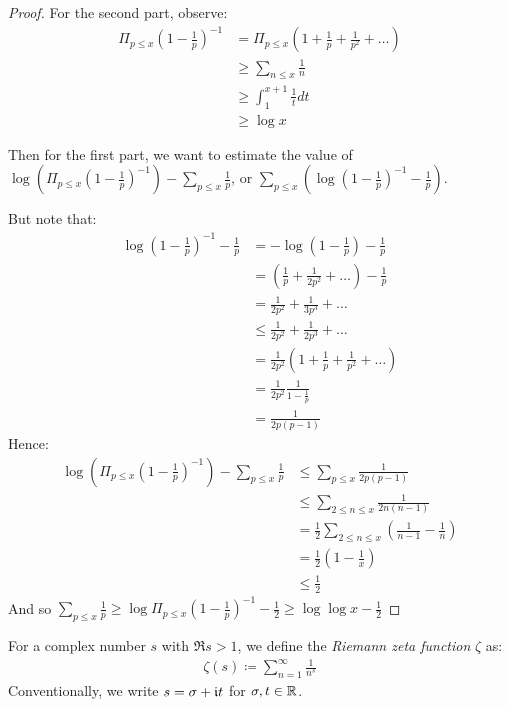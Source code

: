 \documentclass[10pt,a4paper]{article}
\begin{document}
\begin{proof}
For the second part, observe:
\begin{align*}
\Pi_{p\leq x} (1-\frac{1}{p})^{-1} &= \Pi_{p\leq x}(1+\frac{1}{p}+\frac{1}{p^2}+\ldots)\\
&\geq \sum_{n \leq x} \frac{1}{n}\\
&\geq \int_1^{x+1} \frac{1}{t} dt\\
&\geq \log x
\end{align*}

Then for the first part, we want to estimate the value of $\log\left(\Pi_{p\leq x}(1-\frac{1}{p})^{-1}\right) - \sum_{p\leq x}\frac{1}{p}$, or $\sum_{p\leq x}\left(\log(1-\frac{1}{p})^{-1} - \frac{1}{p}\right)$.

But note that:
\begin{align*}
\log(1-\frac{1}{p})^{-1} - \frac{1}{p} &= -\log(1-\frac{1}{p}) - \frac{1}{p}\\
&= (\frac{1}{p} + \frac{1}{2p^2} + \ldots ) -\frac{1}{p}\\
&= \frac{1}{2p^2} + \frac{1}{3p^3} + \ldots \\
&\leq \frac{1}{2p^2} + \frac{1}{2p^3} + \ldots \\
&= \frac{1}{2p^2}\left(1+\frac{1}{p}+\frac{1}{p^2}+\ldots\right)\\
&= \frac{1}{2p^2}\frac{1}{1-\frac{1}{p}}\\
&= \frac{1}{2p(p-1)}
\end{align*}
Hence:
\begin{align*}
\log\left(\Pi_{p\leq x} \left(1-\frac{1}{p}\right)^{-1}\right) - \sum_{p\leq x}\frac{1}{p} &\leq \sum_{p\leq x} \frac{1}{2p(p-1)}\\
&\leq \sum_{2\leq n\leq x} \frac{1}{2n(n-1)}\\
&= \frac{1}{2} \sum_{2\leq n\leq x} \left(\frac{1}{n-1} - \frac{1}{n}\right)\\
&= \frac{1}{2}\left(1-\frac{1}{x}\right)\\
&\leq \frac{1}{2}
\end{align*}
And so $\sum_{p\leq x}\frac{1}{p} \geq \log \Pi_{p\leq x} (1-\frac{1}{p})^{-1} - \frac{1}{2} \geq \log\log x - \frac{1}{2}$
\end{proof}

For a complex number $s$ with $\Re s > 1$, we define the \emph{Riemann zeta function} $\zeta$ as:
\begin{align*}
\zeta(s) \coloneqq \sum_{n=1}^\infty \frac{1}{n^s}
\end{align*}
Conventionally, we write $s = \sigma + \mathfrak{i} t$ for $\sigma, t \in \mathbb{R}$.
\end{document}

